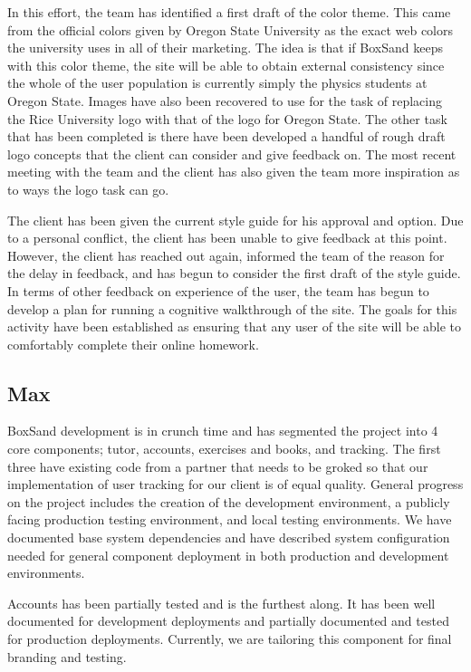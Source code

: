 \documentclass[onecolumn, draftclsnofoot,10pt, compsoc]{IEEEtran}
\begin{document}
In this effort, the team has identified a first draft of the color theme. This came from the official colors given by Oregon State University as the exact web colors the university uses in all of their marketing. The idea is that if BoxSand keeps with this color theme, the site will be able to obtain external consistency since the whole of the user population is currently simply the physics students at Oregon State. Images have also been recovered to use for the task of replacing the Rice University logo with that of the logo for Oregon State. The other task that has been completed is there have been developed a handful of rough draft logo concepts that the client can consider and give feedback on. The most recent meeting with the team and the client has also given the team more inspiration as to ways the logo task can go.

The client has been given the current style guide for his approval and option. Due to a personal conflict, the client has been unable to give feedback at this point. However, the client has reached out again, informed the team of the reason for the delay in feedback, and has begun to consider the first draft of the style guide. In terms of other feedback on experience of the user, the team has begun to develop a plan for running a cognitive walkthrough of the site. The goals for this activity have been established as ensuring that any user of the site will be able to comfortably complete their online homework. 

\subsection{Max}
BoxSand development is in crunch time and has segmented the project into 4 core components; tutor, accounts, exercises and books, and tracking. The first three have existing code from a partner that needs to be groked so that our implementation of user tracking for our client is of equal quality. General progress on the project includes the creation of the development environment, a publicly facing production testing environment, and local testing environments. We have documented base system dependencies and have described system configuration needed for general component deployment in both production and development environments. 

Accounts has been partially tested and is the furthest along. It has been well documented for development deployments and partially documented and tested for production deployments. Currently, we are tailoring this component for final branding and testing.  
\end{document}
